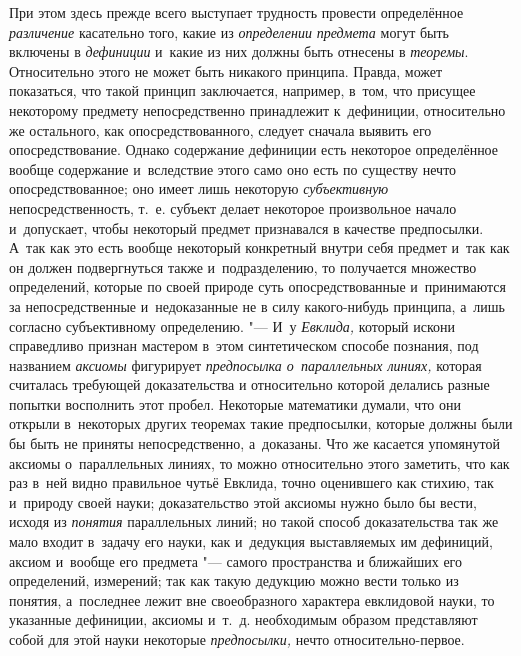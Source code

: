 При этом здесь прежде всего выступает трудность провести
определённое {\em различение}
касательно того, какие из
{\em определении
}{\em предмета} могут
быть включены в {\em дефиниции}
и~какие из них должны быть отнесены в
{\em теоремы}.
Относительно этого не может быть никакого принципа. Правда,
может показаться, что такой принцип заключается, например, в~том, что
присущее некоторому предмету непосредственно принадлежит к~дефиниции,
относительно же остального, как опосредствованного, следует сначала выявить
его опосредствование. Однако содержание дефиниции есть некоторое
определённое вообще содержание и~вследствие этого само оно есть по существу
нечто опосредствованное; оно имеет лишь некоторую
{\em субъективную}
непосредственность, т.~е. субъект делает некоторое
произвольное начало и~допускает, чтобы некоторый предмет признавался в
качестве предпосылки. А~так как это есть вообще некоторый конкретный внутри
себя предмет и~так как он должен подвергнуться также и~подразделению, то
получается множество определений, которые по своей природе суть
опосредствованные и~принимаются за непосредственные и~недоказанные не в
силу какого-нибудь принципа, а~лишь согласно субъективному определению. "---
И~у {\em Евклида,}
который искони справедливо признан мастером в~этом
синтетическом способе познания, под названием
{\em аксиомы} фигурирует
{\em предпосылка о~параллельных
линиях,} которая считалась требующей доказательства и
относительно которой делались разные попытки восполнить этот пробел.
Некоторые математики думали, что они открыли в~некоторых других теоремах
такие предпосылки, которые должны были бы быть не приняты непосредственно,
а~доказаны. Что же касается упомянутой аксиомы о~параллельных линиях, то
можно относительно этого заметить, что как раз в~ней видно правильное чутьё
Евклида, точно оценившего как стихию, так и~природу своей науки;
доказательство этой аксиомы нужно было бы вести, исходя из
{\em понятия}
параллельных линий; но такой способ доказательства так же
мало входит в~задачу его науки, как и~дедукция выставляемых им дефиниций,
аксиом и~вообще его предмета "--- самого пространства и
ближайших его определений, измерений; так как такую дедукцию можно вести
только из понятия, а~последнее лежит вне своеобразного характера евклидовой
науки, то указанные дефиниции, аксиомы и~т.~д. необходимым образом
представляют собой для этой науки некоторые
{\em предпосылки,} нечто
относительно-первое.

